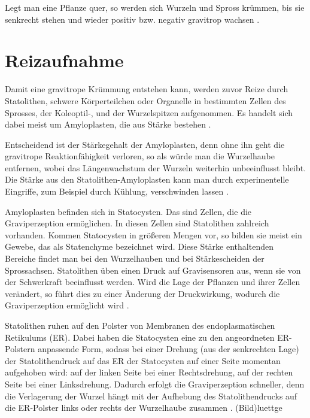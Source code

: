 \documentclass[
a4paper, 
11pt, 
ngerman,
listof=totoc,
bibliography=totocnumbered,
abstracton
]{scrreprt}
\begin{document}
Legt man eine Pflanze quer, so werden sich Wurzeln und Spross krümmen, bis sie senkrecht stehen und wieder positiv bzw. negativ gravitrop wachsen
\parencite[528]{Luettge}.






\section{Reizaufnahme}

Damit eine gravitrope Krümmung entstehen kann, werden zuvor Reize durch Statolithen, schwere Körperteilchen oder Organelle in bestimmten Zellen des Sprosses, der Koleoptil-, und der Wurzelspitzen aufgenommen. Es handelt sich dabei meist um Amyloplasten, die aus Stärke bestehen \parencite[530]{Luettge}.

Entscheidend ist der Stärkegehalt  der Amyloplasten, denn ohne ihn geht die gravitrope Reaktionfähigkeit verloren, so als würde man die Wurzelhaube entfernen, wobei das Längenwachstum der Wurzeln weiterhin unbeeinflusst bleibt.
Die Stärke aus den Statolithen-Amyloplasten kann man durch experimentelle Eingriffe, zum Beispiel durch Kühlung, verschwinden lassen \parencite[452]{Strasburger}.

Amyloplasten befinden sich in Statocysten. Das sind Zellen, die die Graviperzeption ermöglichen. In diesen Zellen sind Statolithen zahlreich vorhanden. Kommen Statocysten in größeren Mengen vor, so bilden sie meist ein Gewebe, das als Statenchyme bezeichnet wird.
Diese Stärke enthaltenden Bereiche findet man bei den Wurzelhauben und bei Stärkescheiden der Sprossachsen.  
Statolithen üben einen Druck auf Gravisensoren aus, wenn sie von der Schwerkraft beeinflusst werden. Wird die Lage der Pflanzen und ihrer Zellen verändert, so führt dies zu einer Änderung der Druckwirkung, wodurch die Graviperzeption ermöglicht wird \parencite[501f]{Nultsch}.


Statolithen ruhen auf den {\glqq Polster\grqq} von Membranen des endoplasmatischen Retikulums (ER). Dabei haben die Statocysten eine zu den angeordneten ER-Polstern anpassende Form, sodass bei einer Drehung (aus der senkrechten Lage) der Statolithendruck auf das ER der Statocysten auf einer Seite momentan aufgehoben wird: auf der linken Seite bei einer Rechtsdrehung, auf der rechten Seite bei einer Linksdrehung.
Dadurch erfolgt die Graviperzeption schneller, denn die Verlagerung der Wurzel hängt  mit der Aufhebung des Statolithendrucks auf die ER-Polster links oder rechts der Wurzelhaube zusammen \parencite[531f]{Luettge}. (Bild)luettge
\end{document}
